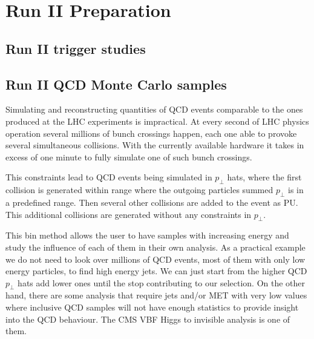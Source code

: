 \chapter{Run II Preparation}
\label{CHAPTER:RunIIPreparation}

\glsresetall %

\section{Run II trigger studies}
\label{SECTION:RunIITriggerStudies}

\section{Run II QCD Monte Carlo samples}
\label{SECTION:RunIIQCDMonteCarloSamples}

Simulating and reconstructing quantities of \gls{QCD} events comparable to the ones produced at the \gls{LHC} experiments is impractical. At every second of \gls{LHC} physics operation several millions of bunch crossings happen, each one able to provoke several simultaneous collisions. With the currently available hardware it takes in excess of one minute to fully simulate one of such bunch crossings. 


This constraints lead to \gls{QCD} events being simulated in $p_\perp$ hats, where the first collision is generated within range where the outgoing particles summed $p_\perp$ is in a predefined range. Then several other collisions are added to the event as \gls{PU}. This additional collisions are generated without any constraints in $p_\perp$. 

This bin method allows the user to have samples with increasing energy and study the influence of each of them in their own analysis. As a practical example we do not need to look over millions of \gls{QCD} events, most of them with only low energy particles, to find high energy jets. We can just start from the higher \gls{QCD} $p_\perp$ hats add lower ones until the stop contributing to our selection. On the other hand, there are some analysis that require jets and/or \gls{MET} with very low values where inclusive \gls{QCD} samples will not have enough statistics to provide insight into the \gls{QCD} behaviour. The \gls{CMS} \gls{VBF} Higgs to invisible analysis is one of them.

